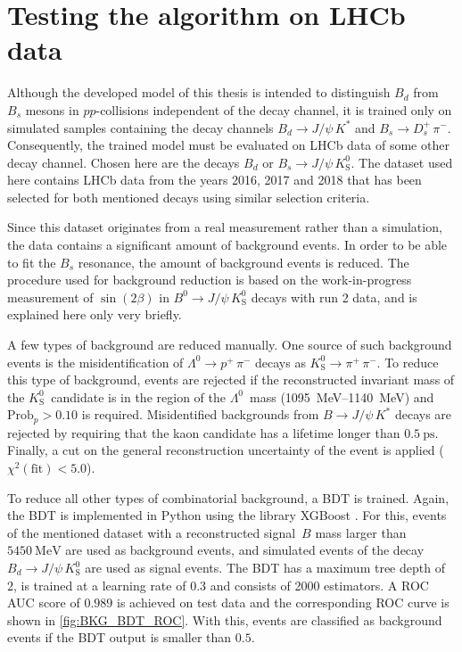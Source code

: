 \section{Testing the algorithm on LHCb data}

Although the developed model of this thesis is intended to distinguish $B_d$ from $B_s$ mesons in $pp$-collisions independent of the decay channel, it is trained only on simulated samples containing the decay channels $B_d \rightarrow J/\psi \, K^*$ and $B_s \rightarrow D^+_s \, \pi^-$.
Consequently, the trained model must be evaluated on LHCb data of some other decay channel.
Chosen here are the decays $B_d \text{ or } B_s \rightarrow J/\psi \, K^0_\text{S}$.
The dataset used here contains LHCb data from the years 2016, 2017 and 2018 that has been selected for both mentioned decays using similar selection criteria. 

Since this dataset originates from a real measurement rather than a simulation, the data contains a significant amount of background events.
In order to be able to fit the $B_s$ resonance, the amount of background events is reduced.
The procedure used for background reduction is based on the work-in-progress measurement of $\sin(2\beta)$ in $B^0\rightarrow J/\psi \, K^0_\text{S}$ decays with run 2 data, and is explained here only very briefly.

A few types of background are reduced manually.
One source of such background events is the misidentification of $\Lambda^0 \rightarrow p^+ \, \pi^-$ decays as $K^0_\text{S} \rightarrow \pi^+ \, \pi^-$.
To reduce this type of background, events are rejected if the reconstructed invariant mass of the $K^0_\text{S}$~candidate is in the region  of the $\Lambda^0$~mass (\qtyrange{1095}{1140}{\MeV}) and $\text{Prob}_p > \num{0.10}$ is required. 
Misidentified backgrounds from $B \rightarrow J/\psi \, K^*$ decays are rejected by requiring that the kaon candidate has a lifetime longer than $\qty{0.5}{\pico\second}$.
Finally, a cut on the general reconstruction uncertainty of the event is applied ($\chi^2(\text{fit})<\num{5.0}$).

To reduce all other types of combinatorial background, a BDT is trained.
Again, the BDT is implemented in Python using the library XGBoost \cite{xgboost}.
For this, events of the mentioned dataset with a reconstructed signal~$B$ mass larger than $\qty{5450}{\MeV}$ are used as background events, and simulated events of the decay $B_d \rightarrow J/\psi \, K^0_\text{S}$ are used as signal events.
The BDT has a maximum tree depth of 2, is trained at a learning rate of $0.3$ and consists of 2000 estimators.
A ROC AUC score of $0.989$ is achieved on test data and the corresponding ROC curve is shown in \cref{fig:BKG_BDT_ROC}.
With this, events are classified as background events if the BDT output is smaller than $\num{0.5}$.

